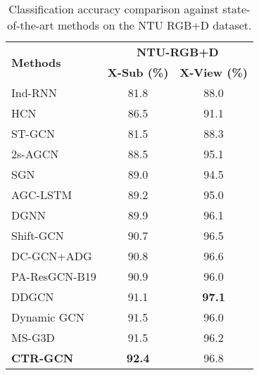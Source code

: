 \documentclass[10pt,twocolumn,letterpaper]{article}
\begin{document}
\begin{table}
	\begin{center}
		\begin{tabular}{l c c}
			\hline
			\multirow{2}{*}{\textbf{Methods}} & \multicolumn{2}{c}{\textbf{NTU-RGB+D}}\\
			& \textbf{X-Sub (\%)} & \textbf{X-View (\%)} \\
			\hline\hline
			Ind-RNN\cite{li2018independently} & 81.8 & 88.0 \\
			HCN\cite{li2018co} & 86.5 & 91.1\\
			\hline
			ST-GCN\cite{yan2018spatial} & 81.5 & 88.3\\
			2s-AGCN\cite{shi2019two} & 88.5 & 95.1\\
			SGN\cite{zhang2020semantics} & 89.0 & 94.5\\
			AGC-LSTM\cite{si2019attention} & 89.2 & 95.0\\
			DGNN\cite{shi2019skeleton} & 89.9 & 96.1\\
			Shift-GCN\cite{cheng2020skeleton} & 90.7 & 96.5\\
			DC-GCN+ADG\cite{cheng2020eccv} & 90.8 & 96.6\\
			PA-ResGCN-B19 \cite{song2020stronger} & 90.9 & 96.0 \\
			DDGCN\cite{korban2020ddgcn} & 91.1 & \textbf{97.1}\\
			Dynamic GCN\cite{ye2020dynamic} & 91.5 & 96.0 \\
			MS-G3D\cite{liu2020disentangling} & 91.5 & 96.2\\
			\hline\hline
			\textbf{CTR-GCN} & \textbf{92.4} & 96.8\\
			\hline
		\end{tabular}
	\end{center}
	\vspace{-0.2cm}
	\caption{Classification accuracy comparison against state-of-the-art methods on the NTU RGB+D dataset.}
	\label{tab:ntu}
\end{table}
\end{document}
